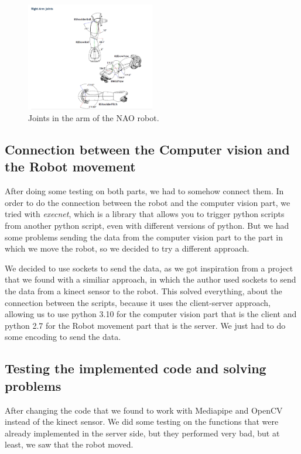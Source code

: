 \documentclass[conference]{IEEEtran}
\begin{document}
\begin{figure}[htbp]
    \label{fig:RightArmAngles}
    \centerline{\includegraphics[width=0.5\textwidth]{images/RightArmAngles.jpeg}}
    \caption{Joints in the arm of the NAO robot.}
\end{figure}

\subsection{Connection between the Computer vision and the Robot movement}
After doing some testing on both parts, we had to somehow connect them. In order to do the connection between the robot and the computer vision part, we tried with \textit{execnet}, which is a library that allows you to trigger python scripts from another python script, even with different versions of python. But we had some problems sending the data from the computer vision part to the part in which we move the robot, so we decided to try a different approach.

We decided to use sockets to send the data, as we got inspiration from a project that we found with a similiar approach, in which the author used sockets to send the data from a kinect sensor to the robot.
This solved everything, about the connection between the scripts, because it uses the client-server approach, allowing us to use python 3.10 for the computer vision part that is the client and python 2.7 for the Robot movement part that is the server. We just had to do some encoding to send the data. 

\subsection{Testing the implemented code and solving problems}
After changing the code that we found to work with Mediapipe and OpenCV instead of the kinect sensor. We did some testing on the functions that were already implemented in the server side, but they performed very bad, but at least, we saw that the robot moved.
\end{document}
